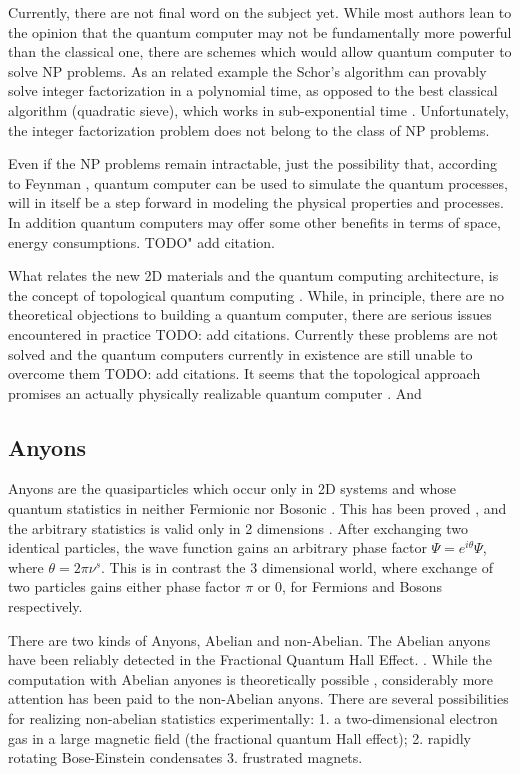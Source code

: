 Currently, there are not final word on the subject yet. While most authors lean to the opinion that the quantum computer may not be fundamentally more powerful than the classical one, there are schemes \cite{NLQC} which would allow quantum computer to solve NP problems. As an related example the Schor's algorithm \cite{Schor} can provably solve integer factorization in a polynomial time, as opposed to the best classical algorithm (quadratic sieve), which works in sub-exponential time \cite{Pomerance}. Unfortunately, the integer factorization problem does not belong to the class of NP problems. 

Even if the NP problems remain intractable, just the possibility that, according to Feynman \cite{FQC}, quantum computer can be used to simulate the quantum processes, will in itself be a step forward in modeling the physical properties and processes. In addition quantum computers may offer some other benefits in terms of space, energy consumptions. TODO" add citation.

What relates the new 2D materials and the quantum computing architecture, is the concept of topological quantum computing \cite{Tqc1}.  While, in principle, there are no theoretical objections to building a quantum computer, there are serious issues encountered in practice TODO: add citations. Currently these problems are not solved and the quantum computers currently in existence are still unable to overcome them TODO: add citations.
It seems that the topological approach promises an actually physically realizable quantum computer \cite{Tqc2,Tqc3}. And 


\subsection*{Anyons}

Anyons are the quasiparticles which occur only in 2D systems and whose quantum statistics in neither Fermionic nor Bosonic \cite{Anyons1}.  This has been proved  \cite{Anyons2}, and the arbitrary statistics is valid only in 2 dimensions \cite{Walsh}. After exchanging two identical particles, the wave function gains an arbitrary phase factor $ \Psi = e^{i\theta}\Psi $, where $ \theta = 2\pi\nu^{s} $. This is in contrast the 3 dimensional world, where exchange of two particles gains either phase factor $ \pi $ or $ 0 $, for Fermions and Bosons respectively.

There are two kinds of Anyons, Abelian and non-Abelian. The Abelian anyons have been reliably detected in the Fractional Quantum Hall Effect. \cite{FQHE}.  While the computation with Abelian anyones is theoretically possible \cite{AbelianAnyons}, considerably more attention has been paid to the non-Abelian anyons.
There are several possibilities for realizing non-abelian statistics experimentally: 1. a two-dimensional electron gas in a large magnetic field (the fractional quantum Hall effect); 2. rapidly rotating Bose-Einstein condensates 3. frustrated magnets.


